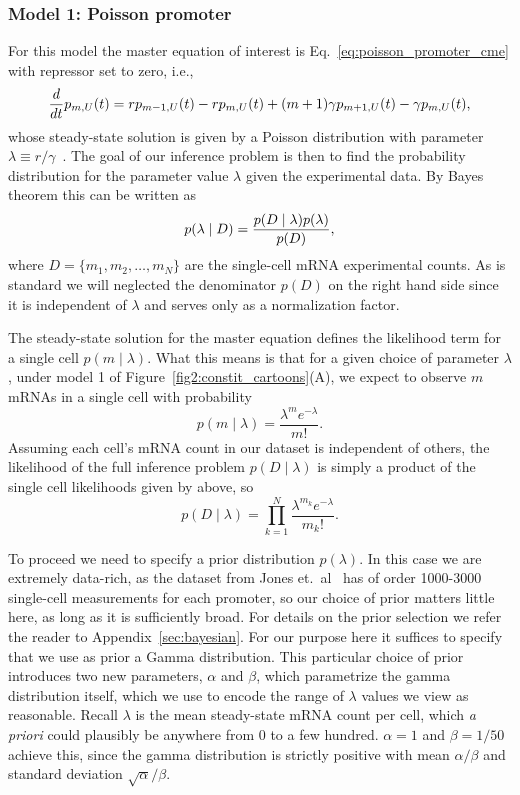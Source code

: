 \subsubsection{Model 1: Poisson promoter}

For this model the master equation of interest is
Eq.~\ref{eq:poisson_promoter_cme} with repressor set to zero, i.e.,
\begin{equation}
{d\over dt}p_{m,U}(t) = 
        rp_{m-1,U}(t) 
        - rp_{m,U}(t)
        + (m+1)\gamma p_{m+1,U}(t) 
        - \gamma p_{m,U}(t),
\end{equation}
whose steady-state solution is given by a Poisson distribution with parameter
$\lambda \equiv r / \gamma$~\cite{Sanchez2013}. The goal of our inference 
problem is then to find the probability distribution for the parameter value
$\lambda$ given the experimental data. By Bayes theorem this can be written as
\begin{equation}
p(\lambda \mid D) = {p(D \mid \lambda) p(\lambda) \over p(D)},
\end{equation}
where $D = \{m_1, m_2, \ldots, m_N \}$ are the single-cell mRNA experimental
counts. As is standard we will neglected the denominator $p(D)$ on the right
hand side since it is independent of $\lambda$ and serves only as a
normalization factor.

The steady-state solution for the master equation defines the likelihood
term for a single cell $p(m \mid \lambda)$. What this means is that for a given
choice of parameter $\lambda$, under model 1 of
Figure~\ref{fig2:constit_cartoons}(A), we expect to observe $m$ mRNAs in a
single cell with probability
\begin{equation}
p(m\mid\lambda) = \frac{\lambda^m e^{-\lambda}}{m!}.
\label{eq:poisson_inference010}
\end{equation}
Assuming each cell's mRNA count in our dataset is independent of others, the
likelihood of the full inference problem $p(D\mid\lambda)$ is simply a product
of the single cell likelihoods given by  above, so
\begin{equation}
p(D\mid\lambda) = \prod_{k=1}^N \frac{\lambda^{m_k}e^{-\lambda}}{m_k!}.
\end{equation}

To proceed we need to specify a prior distribution $p(\lambda)$. In this case we
are extremely data-rich, as the dataset from Jones et.\ al~\cite{Jones2014} has
of order 1000-3000 single-cell measurements for each promoter, so our choice of
prior matters little here, as long as it is sufficiently broad. For details on
the prior selection we refer the reader to Appendix~\ref{sec:bayesian}. For our
purpose here it suffices to specify that we use as prior a Gamma distribution.
This particular choice of prior introduces two new parameters, $\alpha$ and
$\beta$, which parametrize the gamma distribution itself, which we use to encode
the range of $\lambda$ values we view as reasonable. Recall $\lambda$ is the
mean steady-state mRNA count per cell, which \textit{a priori} could plausibly
be anywhere from 0 to a few hundred. $\alpha=1$ and $\beta=1/50$ achieve this,
since the gamma distribution is strictly positive with mean $\alpha/\beta$ and
standard deviation $\sqrt{\alpha}/\beta$.

